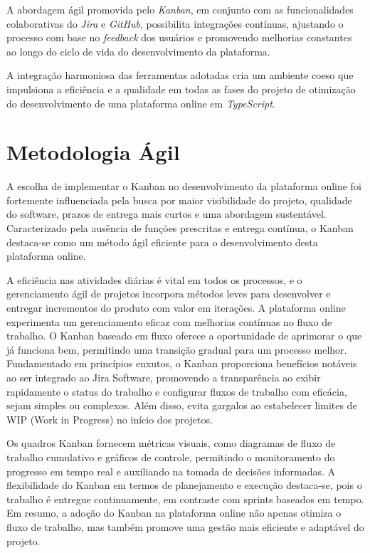 A abordagem ágil promovida pelo \textit{Kanban}, em conjunto com as funcionalidades colaborativas do \textit{Jira} e \textit{GitHub}, possibilita integrações contínuas, ajustando o processo com base no \textit{feedback} dos usuários e promovendo melhorias constantes ao longo do ciclo de vida do desenvolvimento da plataforma.

A integração harmoniosa das ferramentas adotadas cria um ambiente coeso que impulsiona a eficiência e a qualidade em todas as fases do projeto de otimização do desenvolvimento de uma plataforma online em \textit{TypeScript}.

\section{Metodologia Ágil}

A escolha de implementar o Kanban no desenvolvimento da plataforma online foi fortemente influenciada pela busca por maior visibilidade do projeto, qualidade do software, prazos de entrega mais curtos e uma abordagem sustentável. Caracterizado pela ausência de funções prescritas e entrega contínua, o Kanban destaca-se como um método ágil eficiente para o desenvolvimento desta plataforma online.

A eficiência nas atividades diárias é vital em todos os processos, e o gerenciamento ágil de projetos incorpora métodos leves para desenvolver e entregar incrementos do produto com valor em iterações. A plataforma online experimenta um gerenciamento eficaz com melhorias contínuas no fluxo de trabalho. O Kanban baseado em fluxo oferece a oportunidade de aprimorar o que já funciona bem, permitindo uma transição gradual para um processo melhor. Fundamentado em princípios enxutos, o Kanban proporciona benefícios notáveis ao ser integrado ao Jira Software, promovendo a transparência ao exibir rapidamente o status do trabalho e configurar fluxos de trabalho com eficácia, sejam simples ou complexos. Além disso, evita gargalos ao estabelecer limites de WIP (Work in Progress) no início dos projetos.

Os quadros Kanban fornecem métricas visuais, como diagramas de fluxo de trabalho cumulativo e gráficos de controle, permitindo o monitoramento do progresso em tempo real e auxiliando na tomada de decisões informadas. A flexibilidade do Kanban em termos de planejamento e execução destaca-se, pois o trabalho é entregue continuamente, em contraste com sprints baseados em tempo. Em resumo, a adoção do Kanban na plataforma online não apenas otimiza o fluxo de trabalho, mas também promove uma gestão mais eficiente e adaptável do projeto.

